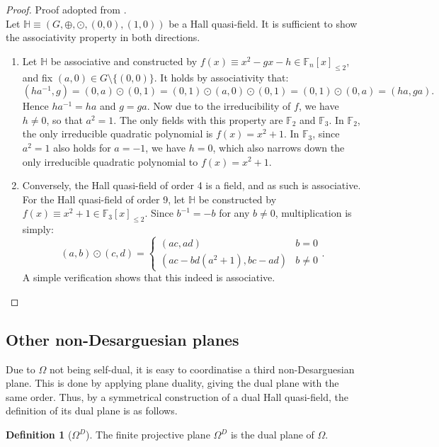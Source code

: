 \documentclass{report}
\newcommand{\F}{\mathbb{F}}
\renewcommand{\H}{\mathbb{H}}
\theoremstyle{definition}\newtheorem*{definition}{Definition}
\theoremstyle{definition}\newtheorem*{example}{Example}
\theoremstyle{remark}\newtheorem*{remark}{Remark}
\begin{document}
\begin{proof}
Proof adopted from \cite{5}. \\
Let $ \H \equiv (G, \oplus, \odot, (0, 0), (1, 0)) $ be a Hall quasi-field. It is sufficient to show the associativity property in both directions.
\begin{enumerate}
  \item Let $ \H $ be associative and constructed by $ f(x) \equiv x^2 - gx - h \in \F_n[x]_{\le 2} $, and fix $ (a, 0) \in G \setminus \{ (0, 0) \} $. It holds by associativity that: $$ (ha^{-1}, g) = (0, a) \odot (0, 1) = (0, 1) \odot (a, 0) \odot (0, 1) = (0, 1) \odot (0, a) = (ha, ga). $$ Hence $ ha^{-1} = ha $ and $ g = ga $. Now due to the irreducibility of $ f $, we have $ h \ne 0 $, so that $ a^2 = 1 $. The only fields with this property are $ \F_2 $ and $ \F_3 $. In $ \F_2 $, the only irreducible quadratic polynomial is $ f(x) = x^2 + 1 $. In $ \F_3 $, since $ a^2 = 1 $ also holds for $ a = -1 $, we have $ h = 0 $, which also narrows down the only irreducible quadratic polynomial to $ f(x) = x^2 + 1 $.
  \item Conversely, the Hall quasi-field of order 4 is a field, and as such is associative. For the Hall quasi-field of order 9, let $ \H $ be constructed by $ f(x) \equiv x^2 + 1 \in \F_3[x]_{\le 2} $. Since $ b^{-1} = -b $ for any $ b \ne 0 $, multiplication is simply: $$ (a, b) \odot (c, d) = \begin{cases} (ac, ad) & b = 0 \\ (ac - b d (a^2 + 1), bc - ad) & b \ne 0 \end{cases}. $$ A simple verification shows that this indeed is associative.
\end{enumerate}
\end{proof}

\subsection{Other non-Desarguesian planes}

Due to $ \Omega $ not being self-dual, it is easy to coordinatise a third non-Desarguesian plane. This is done by applying plane duality, giving the dual plane with the same order. Thus, by a symmetrical construction of a dual Hall quasi-field, the definition of its dual plane is as follows.

\begin{definition}[$ \Omega^D $]
The finite projective plane $ \Omega^D $ is the dual plane of $ \Omega $.
\end{definition}
\end{document}
